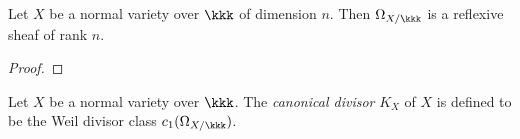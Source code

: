     \begin{proposition}\label{prop:Omega_X_is_reflexive_when_X_is_normal}
        Let \(X\) be a normal variety over \(\kkk\) of dimension \(n\).
        Then \(\Omega_{X/\kkk}\) is a reflexive sheaf of rank \(n\).
    \end{proposition}
    \begin{proof}
    \end{proof}

    \begin{definition}\label{def:canonical_divisor_on_normal_varieties}
        Let \(X\) be a normal variety over \(\kkk\).
        The \emph{canonical divisor} \(K_X\) of \(X\) is defined to be the Weil divisor class \(c_1(\Omega_{X/\kkk})\).
    \end{definition}



